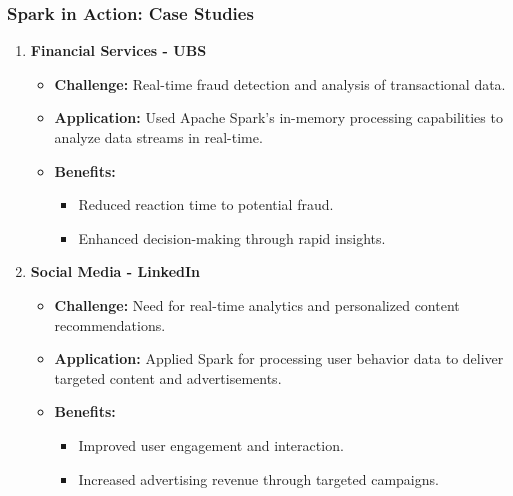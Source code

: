 \documentclass{beamer}
\begin{document}
\begin{frame}[fragile]
    \frametitle{Spark in Action: Case Studies}
    \begin{enumerate}
        \item \textbf{Financial Services - UBS}
            \begin{itemize}
                \item \textbf{Challenge:} Real-time fraud detection and analysis of transactional data.
                \item \textbf{Application:} Used Apache Spark’s in-memory processing capabilities to analyze data streams in real-time.
                \item \textbf{Benefits:}
                    \begin{itemize}
                        \item Reduced reaction time to potential fraud.
                        \item Enhanced decision-making through rapid insights.
                    \end{itemize}
            \end{itemize}
        
        \item \textbf{Social Media - LinkedIn}
            \begin{itemize}
                \item \textbf{Challenge:} Need for real-time analytics and personalized content recommendations.
                \item \textbf{Application:} Applied Spark for processing user behavior data to deliver targeted content and advertisements.
                \item \textbf{Benefits:}
                    \begin{itemize}
                        \item Improved user engagement and interaction.
                        \item Increased advertising revenue through targeted campaigns.
                    \end{itemize}
            \end{itemize}
    \end{enumerate}
\end{frame}
\end{document}
